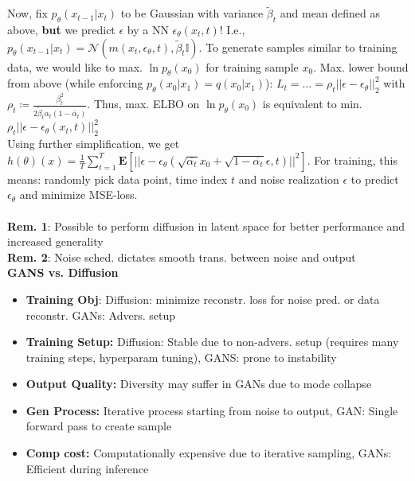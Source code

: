 Now, fix $p_\theta(x_{t-1}|x_t)$ to be Gaussian with variance $\tilde{\beta}_t$ and mean defined as above, \textbf{but} we predict $\epsilon$ by a NN $\epsilon_\theta(x_t,t)$! I.e., $p_\theta(x_{t-1}|x_t)=\mathcal{N}(m(x_t,\epsilon_\theta,t),\tilde{\beta}_t\mathbb{I})$. To generate samples similar to training data, we would like to max. $\ln p_\theta(x_0)$ for training sample $x_0$. \textrightarrow Max. lower bound from above (while enforcing $p_\theta(x_0|x_1)=q(x_0|x_1)$): $L_t=\dots=\rho_t||\epsilon-\epsilon_\theta||^2_2$ with $\rho_t\coloneqq\frac{\beta_t^2}{2\tilde{\beta}_t \alpha_t(1-\bar{\alpha}_t)}$. Thus, max. ELBO on $\ln p_\theta(x_0)$ is equivalent to min. $\rho_t||\epsilon-\epsilon_\theta(x_t,t)||^2_2$\\
Using further simplification, we get \( h(\theta)(x)=\frac{1}{T}{\sum_{t=1}^T} \mathbf{E}[||\epsilon-\epsilon_\theta(\sqrt{\overline{\alpha_t}}x_0+\sqrt{1-\overline{\alpha_t}}\epsilon,t)||^2]\). For training, this means: randomly pick data point, time index $t$ and noise realization $\epsilon$ to predict $\epsilon_\theta$ and minimize MSE-loss.\\
\vspace{0.01cm}\dotfill\vspace{0.01cm}\\
\textbf{Rem. 1}: Possible to perform diffusion in latent space for better performance and increased generality\\
\textbf{Rem. 2}: Noise sched. dictates smooth trans. between noise and output\\
\textbf{GANS vs. Diffusion}
\begin{itemize}
    \item \textbf{Training Obj}: Diffusion: minimize reconstr. loss for noise pred. or data reconstr. GANs: Advers. setup
    \item \textbf{Training Setup:} Diffusion: Stable due to non-advers. setup (requires many training steps, hyperparam tuning), GANS: prone to instability
    \item \textbf{Output Quality:} Diversity may suffer in GANs due to mode collapse
    \item \textbf{Gen Process:} Iterative process starting from noise to output, GAN: Single forward pass to create sample
    \item \textbf{Comp cost:} Computationally expensive due to iterative sampling, GANs: Efficient during inference
\end{itemize}